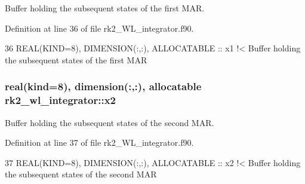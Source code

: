 Buffer holding the subsequent states of the first M\+AR. 



Definition at line 36 of file rk2\+\_\+\+W\+L\+\_\+integrator.\+f90.


\begin{DoxyCode}
36   \textcolor{keywordtype}{REAL(KIND=8)}, \textcolor{keywordtype}{DIMENSION(:,:)}, \textcolor{keywordtype}{ALLOCATABLE} :: x1\textcolor{comment}{ !< Buffer holding the subsequent states of the first MAR}
\end{DoxyCode}
\subsubsection[{\texorpdfstring{x2}{x2}}]{\setlength{\rightskip}{0pt plus 5cm}real(kind=8), dimension(\+:,\+:), allocatable rk2\+\_\+wl\+\_\+integrator\+::x2\hspace{0.3cm}{\ttfamily [private]}}\hypertarget{namespacerk2__wl__integrator_a7fad5dbd04a9b5dc47bdb9b8c33e44e0}{}\label{namespacerk2__wl__integrator_a7fad5dbd04a9b5dc47bdb9b8c33e44e0}


Buffer holding the subsequent states of the second M\+AR. 



Definition at line 37 of file rk2\+\_\+\+W\+L\+\_\+integrator.\+f90.


\begin{DoxyCode}
37   \textcolor{keywordtype}{REAL(KIND=8)}, \textcolor{keywordtype}{DIMENSION(:,:)}, \textcolor{keywordtype}{ALLOCATABLE} :: x2\textcolor{comment}{ !< Buffer holding the subsequent states of the second MAR}
\end{DoxyCode}
